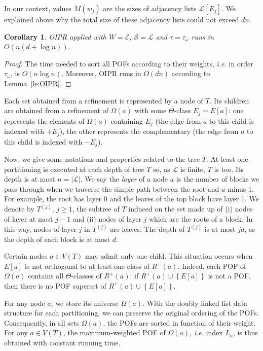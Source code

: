 \documentclass{article}
\newtheorem{corollary}{Corollary}
\newcommand{\set}[1]{\left\{ #1 \right\}}
\newcommand{\card}[1]{\left| #1 \right|}
\begin{document}
In our context, values $M(w_j)$ are the sizes of adjacency lists $\mathcal{L}\left[E_j\right]$. We explained above why the total size of these adjacency lists could not exceed $dn$.

\begin{corollary} OIPR applied with $W = \mathcal{E}$, $\mathcal{S} = \mathcal{L}$ and $\tau = \tau_{\omega}$ runs in $O(n(d+\log n))$.
\label{co:oipr}
\end{corollary}
\begin{proof}
The time needed to sort all POFs according to their weights, {\em i.e.} in order $\tau_{\omega}$, is $O(n\log n)$. Moreover, OIPR runs in $O(dn)$  according to Lemma~\ref{le:OIPR}.
\end{proof}

Each set obtained from a refinement is represented by a node of $T$. Its children are obtained from a refinement of $\Omega(a)$ with some $\Theta$-class $E_j=E\left[a\right]$: one represents the elements of $\Omega(a)$ containing $E_j$ (the edge from $a$ to this child is indexed with $+E_j$), the other represents the complementary (the edge from $a$ to this child is indexed with $-E_j$).

Now, we give some notations and properties related to the tree $T$. At least one partitioning is executed at each depth of tree $T$ so, as $\mathcal{L}$ is finite, $T$ is too. Its depth is at most $n = \card{\mathcal{L}}$. 
We say the \textit{layer} of a node $a$ is the number of blocks we pass through when we traverse the simple path between the root and $a$ minus 1. For example, the root has layer 0 and the leaves of the top block have layer 1. We denote by $T^{(j)}$, $j\ge 1$, the subtree of $T$ induced on the set made up of (i) nodes of layer at most $j-1$ and (ii) nodes of layer $j$ which are the roots of a block. In this way, nodes of layer $j$ in $T^{(j)}$ are leaves. The depth of $T^{(j)}$ is at most $jd$, as the depth of each block is at most $d$. 

Certain nodes $a \in V(T)$ may admit only one child. This situation occurs when $E\left[a\right]$ is not orthogonal to at least one class of $R^+(a)$. Indeed, each POF of $\Omega(a)$ contains all $\Theta$-classes of $R^+(a)$: if $R^+(a) \cup \set{E\left[a\right]}$ is not a POF, then there is no POF superset of $R^+(a) \cup \set{E\left[a\right]}$. 

For any node $a$, we store its universe $\Omega(a)$. With the doubly linked list data structure for each partitioning, we can preserve the original ordering of the POFs. Consequently, in all sets $\Omega(a)$, the POFs are sorted in function of their weight. For any $a \in V(T)$, the maximum-weighted POF of $\Omega(a)$, {\em i.e.} index $L_a$, is thus obtained with constant running time.
\end{document}
